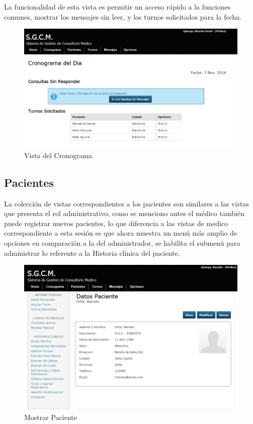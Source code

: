 La funcionalidad de esta vista es permitir un acceso rápido a la funciones comunes, mostrar los mensajes sin leer, y los turnos solicitados para la fecha.

\begin{figure}[H]
    \centering
    \includegraphics[scale=0.5]{resourse/cronograma.png}
    \caption{Vista del Cronograma}
    \label{fig:614}
\end{figure}


\subsection{Pacientes}

La colección de vistas correspondientes a los pacientes son similares a las vistas que presenta el rol administrativo, como se menciono antes el médico también puede registrar nuevos pacientes, lo que diferencia a las vistas de medico correspondiente a esta sesión es que ahora muestra un menú más amplio de opciones en comparación a la del administrador, se habilita el submenú para administrar lo referente a la
Historia clínica del paciente.

\begin{figure}[H]
    \centering
    \includegraphics[scale=0.5]{resourse/datos-paciente-m.png}
    \caption{Mostrar Paciente}
    \label{fig:615}
\end{figure}

